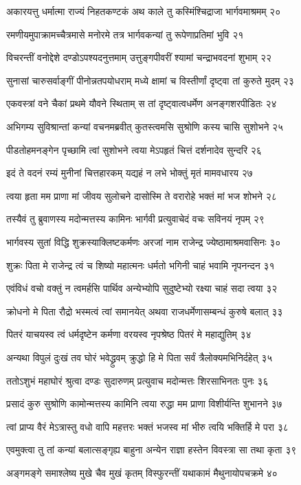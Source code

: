 अकारयत्तु धर्मात्मा राज्यं निहतकण्टकं
अथ काले तु कस्मिंश्चिद्राजा भार्गवमाश्रमम् २०

रमणीयमुपाक्रामच्चैत्रमासे मनोरमे
तत्र भार्गवकन्यां तु रूपेणाप्रतिमां भुवि २१

विचरन्तीं वनोद्देशे दण्डोऽपश्यदनुत्तमाम्
उत्तुङ्गपीवरीं श्यामां चन्द्राभवदनां शुभाम् २२

सुनासां चारुसर्वाङ्गीं पीनोन्नतपयोधराम्
मध्ये क्षामां च विस्तीर्णां दृष्ट्वा तां कुरुते मुदम् २३

एकवस्त्रां वने चैकां प्रथमे यौवने स्थिताम्
स तां दृष्ट्वात्वधर्मेण अनङ्गशरपीडितः २४

अभिगम्य सुविश्रान्तां कन्यां वचनमब्रवीत्
कुतस्त्वमसि सुश्रोणि कस्य चासि सुशोभने २५

पीडतोहमनङ्गेन पृच्छामि त्वां सुशोभने
त्वया मेऽपहृतं चित्तं दर्शनादेव सुन्दरि २६

इदं ते वदनं रम्यं मुनीनां चित्तहारकम्
यद्यहं न लभे भोक्तुं मृतं मामवधारय २७

त्वया हृता मम प्राणा मां जीवय सुलोचने
दासोस्मि ते वरारोहे भक्तं मां भज शोभने २८

तस्यैवं तु ब्रुवाणस्य मदोन्मत्तस्य कामिनः
भार्गवी प्रत्युवाचेदं वचः सविनयं नृपम् २९

भार्गवस्य सुतां विद्धि शुक्रस्याक्लिष्टकर्मणः
अरजां नाम राजेन्द्र ज्येष्ठामाश्रमवासिनः ३०

शुक्रः पिता मे राजेन्द्र त्वं च शिष्यो महात्मनः
धर्मतो भगिनी चाहं भवामि नृपनन्दन ३१

एवंविधं वचो वक्तुं न त्वमर्हसि पार्थिव
अन्येभ्योपि सुदुष्टेभ्यो रक्ष्या चाहं सदा त्वया ३२

क्रोधनो मे पिता रौद्रो भस्मत्वं त्वां समानयेत्
अथवा राजधर्मेणासम्बन्धं कुरुषे बलात् ३३

पितरं याचयस्व त्वं धर्मदृष्टेन कर्मणा
वरयस्व नृपश्रेष्ठ पितरं मे महाद्युतिम् ३४

अन्यथा विपुलं दुःखं तव घोरं भवेद्ध्रुवम्
क्रुद्धो हि मे पिता सर्वं त्रैलोक्यमभिनिर्दहेत् ३५

ततोऽशुभं महाघोरं श्रुत्वा दण्डः सुदारुणम्
प्रत्युवाच मदोन्मत्तः शिरसाभिनतः पुनः ३६

प्रसादं कुरु सुश्रोणि कामोन्मत्तस्य कामिनि
त्वया रुद्धा मम प्राणा विशीर्यन्ति शुभानने ३७

त्वां प्राप्य वैरं मेऽत्रास्तु वधो वापि महत्तरः
भक्तं भजस्व मां भीरु त्वयि भक्तिर्हि मे परा ३८

एवमुक्त्वा तु तां कन्यां बलात्सङ्गृह्य बाहुना
अन्येन राज्ञा हस्तेन विवस्त्रा सा तथा कृता ३९

अङ्गमङ्गे समाश्लेष्य मुखे चैव मुखं कृतम्
विस्फुरन्तीं यथाकामं मैथुनायोपचक्रमे ४०

